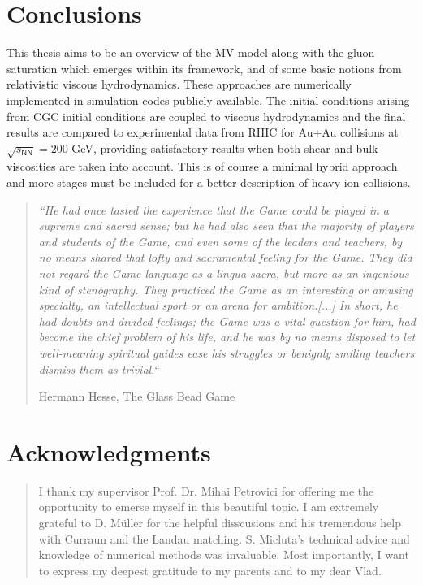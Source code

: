 \setchapterpreamble[u]{\margintoc}
\chapter{Conclusions}
\begin{fullwidth}
This thesis aims to be an overview of the {\sffamily MV} model along with the gluon saturation which emerges within its framework, and of some basic notions from relativistic viscous hydrodynamics. These approaches are numerically implemented in simulation codes publicly available. The initial conditions arising from {\sffamily CGC} initial conditions are coupled to viscous hydrodynamics and the final results are compared to experimental data from {\sffamily RHIC} for {\sffamily Au+Au} collisions at $\sqrt{s_\textsf{NN}}=200$ GeV, providing satisfactory results when both shear and bulk viscosities are taken into account. This is of course a minimal hybrid approach and more stages must be included for a better description of heavy-ion collisions. 
\end{fullwidth}

\vspace{2cm}

\begin{fullwidth}
\begin{quote}
  {\itshape ``He had once tasted the experience that the Game could be played in a supreme and sacred sense; but he had also seen that the majority of players and students of the Game, and even some of the leaders and teachers, by no means shared that lofty and sacramental feeling for the Game. They did not regard the Game language as a lingua sacra, but more as an ingenious kind of stenography. They practiced the Game as an interesting or amusing specialty, an intellectual sport or an arena for ambition.[...] In short, he had doubts and divided feelings; the Game was a vital question for him, had become the chief problem of his life, and he was by no means disposed to let well-meaning spiritual guides ease his struggles or benignly smiling teachers dismiss them as trivial.``}
  \begin{flushright}
    Hermann Hesse, {\sffamily\color{ming} The Glass Bead Game}
  \end{flushright}
\end{quote}
\end{fullwidth}

\chapter*{Acknowledgments}
\begin{fullwidth}
\begin{quote}
I thank my supervisor Prof. Dr. Mihai Petrovici for offering me the opportunity to emerse myself in this beautiful topic. I am extremely grateful to D. M{\"u}ller for the helpful disscusions and his tremendous help with {\sffamily Curraun} and the Landau matching. S. Micluta's technical advice and knowledge of numerical methods was invaluable. Most importantly, I want to express my deepest gratitude to my parents and to my dear Vlad. 
\end{quote}
\end{fullwidth}


